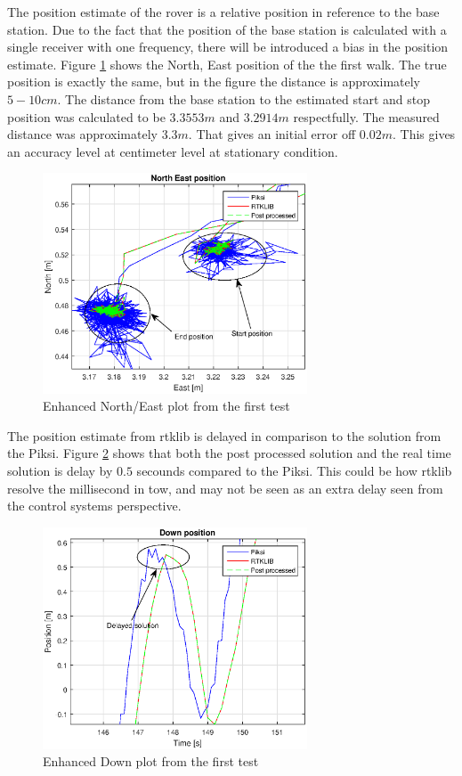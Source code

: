 The position estimate of the rover is a relative position in reference to the base station. Due to the fact that the position of the base station is calculated with a single receiver with one frequency, there will be introduced a bias in the position estimate. Figure \ref{figure:enhancedxywalk1} shows the North, East position of the the first walk. The true position is exactly the same, but in the figure the distance is approximately $5-10cm$. The distance from the base station to the estimated start and stop position was calculated to be $3.3553m$ and $3.2914m$ respectfully. The measured distance was approximately $3.3m$. That gives an initial error off $0.02m$. This gives an accuracy level at centimeter level at stationary condition. 
\begin{figure}[H]
	\centering
		\includegraphics[width=0.7\textwidth]{figs/plots/enhancedxywalk1.eps}
		\caption{Enhanced North/East plot from the first test}
		\label{figure:enhancedxywalk1}
\end{figure}
The position estimate from \gls{rtklib} is delayed in comparison to the solution from the Piksi. Figure \ref{figure:DownDelay} shows that both the post processed solution and the real time solution is delay by $0.5$ secounds compared to the Piksi. This could be how \gls{rtklib} resolve the millisecond in \acrfull{tow}, and may not be seen as an extra delay seen from the control systems perspective.
\begin{figure}[H]
	\centering
		\includegraphics[width=0.7\textwidth]{figs/plots/downDelay.eps}
		\caption{Enhanced Down plot from the first test}
		\label{figure:DownDelay}
\end{figure}

